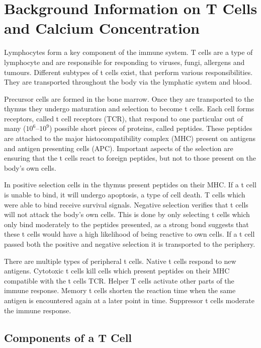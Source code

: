 \chapter{Background Information on T Cells and Calcium Concentration}
\label{chapter:t-cell}

Lymphocytes form a key component of the immune system. T cells are a type of lymphocyte and are responsible for responding to viruses, fungi, allergens and tumours. Different subtypes of t cells exist, that perform various responsibilities. They are transported throughout the body via the lymphatic system and blood.\cite{Kumar2018}

Precursor cells are formed in the bone marrow. Once they are transported to the thymus they undergo maturation and selection to become t cells. Each cell forms receptors, called t cell receptors (TCR), that respond to one particular out of many ($10^6 – 10^9$) possible short pieces of proteins, called peptides. These peptides are attached to the major histocompatibility complex (MHC) present on antigens and antigen presenting cells (APC). Important aspects of the selection are ensuring that the t cells react to foreign peptides, but not to those present on the body's own cells.\cite{Ashby2024}

In positive selection cells in the thymus present peptides on their MHC. If a t cell is unable to bind, it will undergo apoptosis, a type of cell death. T cells which were able to bind receive survival signals. Negative selection verifies that t cells will not attack the body's own cells. This is done by only selecting t cells which only bind moderately to the peptides presented, as a strong bond suggests that these t cells would have a high likelihood of being reactive to own cells.\cite{Hagel2018} If a t cell passed both the positive and negative selection it is transported to the periphery.

There are multiple types of peripheral t cells. Native t cells respond to new antigens. Cytotoxic t cells kill cells which present peptides on their MHC compatible with the t cells TCR. Helper T cells activate other parts of the immune response. Memory t cells shorten the reaction time when the same antigen is encountered again at a later point in time. Suppressor t cells moderate the immune response.\cite{Ganong1997}

\section{Components of a T Cell}

